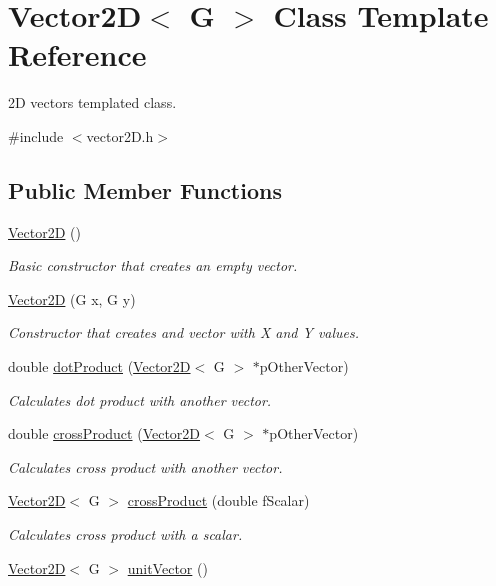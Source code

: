 \hypertarget{class_vector2_d}{}\section{Vector2\+D$<$ G $>$ Class Template Reference}
\label{class_vector2_d}


2\+D vectors templated class.  




{\ttfamily \#include $<$vector2\+D.\+h$>$}

\subsection*{Public Member Functions}
\begin{DoxyCompactItemize}
\item 
\hypertarget{class_vector2_d_a3bce991141a2cfd9c381651c06d2bee5}{}\hyperlink{class_vector2_d_a3bce991141a2cfd9c381651c06d2bee5}{Vector2\+D} ()\label{class_vector2_d_a3bce991141a2cfd9c381651c06d2bee5}

\begin{DoxyCompactList}\small\item\em Basic constructor that creates an empty vector. \end{DoxyCompactList}\item 
\hyperlink{class_vector2_d_a25ac574bd1a4deb41a9b198afd5f2787}{Vector2\+D} (G x, G y)
\begin{DoxyCompactList}\small\item\em Constructor that creates and vector with X and Y values. \end{DoxyCompactList}\item 
double \hyperlink{class_vector2_d_aa69f34ef68bbce55afb63c2e87391203}{dot\+Product} (\hyperlink{class_vector2_d}{Vector2\+D}$<$ G $>$ $\ast$p\+Other\+Vector)
\begin{DoxyCompactList}\small\item\em Calculates dot product with another vector. \end{DoxyCompactList}\item 
double \hyperlink{class_vector2_d_a4be7b15eb3e4e5a4ec415a484061b10d}{cross\+Product} (\hyperlink{class_vector2_d}{Vector2\+D}$<$ G $>$ $\ast$p\+Other\+Vector)
\begin{DoxyCompactList}\small\item\em Calculates cross product with another vector. \end{DoxyCompactList}\item 
\hyperlink{class_vector2_d}{Vector2\+D}$<$ G $>$ \hyperlink{class_vector2_d_a5d05faaee31dd6f71dfdc4a57502e4f8}{cross\+Product} (double f\+Scalar)
\begin{DoxyCompactList}\small\item\em Calculates cross product with a scalar. \end{DoxyCompactList}\item 
\hypertarget{class_vector2_d_a1a734dd9f1ca01a88bac3f6bf2be97d0}{}\hyperlink{class_vector2_d}{Vector2\+D}$<$ G $>$ \hyperlink{class_vector2_d_a1a734dd9f1ca01a88bac3f6bf2be97d0}{unit\+Vector} ()\label{class_vector2_d_a1a734dd9f1ca01a88bac3f6bf2be97d0}


\end{DoxyCompactItemize}
